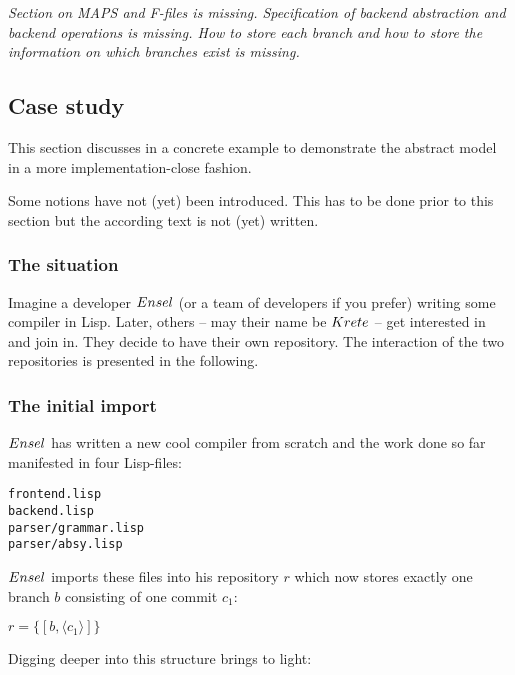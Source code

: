 \documentclass[fleqn, 10pt, a4paper]{article}
\begin{document}
\emph{Section on MAPS and F-files is missing. Specification
of backend abstraction and backend operations is missing.
How to store each branch and how to store the information
on which branches exist is missing.}

\subsection{Case study}

This section discusses in a concrete example to demonstrate the
abstract model in a more implementation-close fashion.

Some notions have not (yet) been introduced. This has to be done
prior to this section but the according text is not (yet) written.

\subsubsection{The situation}

Imagine a developer $\mathnormal{Ensel}$ (or a team of developers
if you prefer) writing
some compiler in Lisp. Later, others --
may their name be $\mathnormal{Krete}$ -- get interested in and join in.
They decide to have their own repository. The interaction of the two
repositories is presented in the following.

\subsubsection{The initial import}

$\mathnormal{Ensel}$ has written a new cool compiler from scratch
and the work done so far manifested in four Lisp-files:

\begin{verbatim}
frontend.lisp
backend.lisp
parser/grammar.lisp
parser/absy.lisp
\end{verbatim}

$\mathnormal{Ensel}$ imports these files into his repository $r$ which
now stores exactly one branch $b$ consisting of one commit $c_1$:

$r=\{[b, \langle c_1\rangle]\}$

Digging deeper into this structure brings to light:
\end{document}

